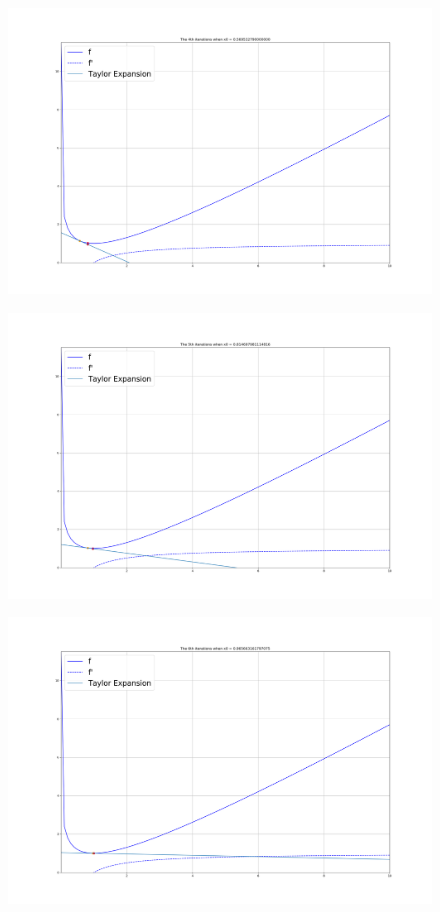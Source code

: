 \documentclass{article}
\theoremstyle{definition}
\theoremstyle{definition}
\theoremstyle{remark}
\begin{document}
\begin{enumerate}
\begin{figure}[H]
    \end{figure}
    \begin{figure}[H]
        \centering
        \includegraphics[scale=0.25]{f44.png}
    \end{figure}
    \begin{figure}[H]
        \centering
        \includegraphics[scale=0.25]{f45.png}
    \end{figure}
    \begin{figure}[H]
        \centering
        \includegraphics[scale=0.25]{f46.png}

\end{figure}
\end{enumerate}
\end{document}
